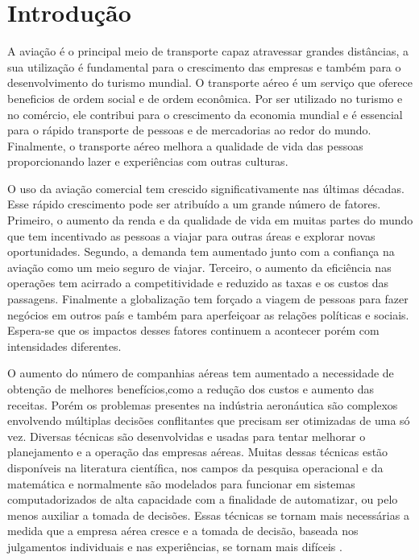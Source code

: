 \chapter{Introdução}
  
  	A aviação é o principal meio de transporte capaz atravessar grandes distâncias, a sua utilização é fundamental para o crescimento das empresas e também para o desenvolvimento do turismo mundial. O transporte aéreo é um serviço que oferece beneficios de ordem social e de ordem econômica. Por ser utilizado no turismo e no comércio, ele contribui para o crescimento da economia mundial e é essencial para o rápido transporte de pessoas e de mercadorias ao redor do mundo. Finalmente, o transporte aéreo melhora a qualidade de vida das pessoas proporcionando lazer e experiências com outras culturas.
  	
  	O uso da aviação comercial tem crescido significativamente nas últimas décadas. Esse rápido crescimento pode ser atribuído a um grande número de fatores. Primeiro, o aumento da renda e da qualidade de vida em muitas partes do mundo que tem incentivado as pessoas a viajar para outras áreas e explorar novas oportunidades. Segundo, a demanda tem aumentado junto com a confiança na aviação como um meio seguro de viajar. Terceiro, o aumento da eficiência nas operações tem acirrado a competitividade e reduzido as taxas e os custos das passagens. Finalmente a globalização tem forçado a viagem de pessoas para fazer negócios em outros país e também para aperfeiçoar as relações políticas e sociais. Espera-se que os impactos desses fatores continuem a acontecer porém com intensidades diferentes.
  	
  	O aumento do número de companhias aéreas tem aumentado a necessidade de obtenção de melhores benefícios,como a redução dos custos e aumento das receitas. Porém os problemas presentes na indústria aeronáutica são complexos envolvendo múltiplas decisões conflitantes que precisam ser otimizadas de uma só vez. Diversas técnicas são desenvolvidas e usadas para tentar melhorar o planejamento e a operação das empresas aéreas. Muitas dessas técnicas estão disponíveis na literatura científica, nos campos da pesquisa operacional e da matemática e normalmente são modelados para funcionar em sistemas computadorizados de alta capacidade com a finalidade de automatizar, ou pelo menos auxiliar a tomada de decisões. Essas técnicas se tornam mais necessárias a medida que a empresa aérea cresce e a tomada de decisão, baseada nos julgamentos individuais e nas experiências, se tornam mais difíceis \cite{ahmed2009}.
  	
